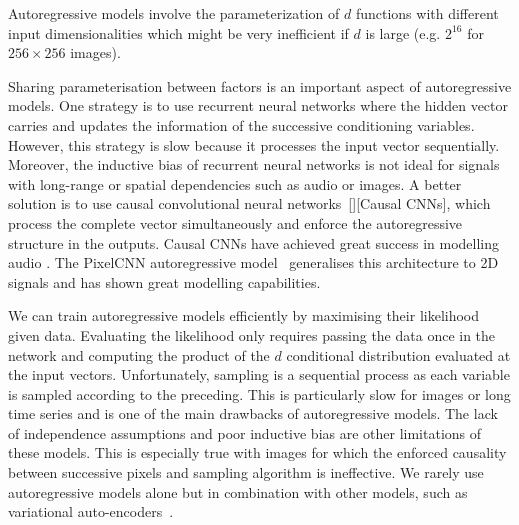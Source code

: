 Autoregressive models involve the parameterization of $d$ functions with different input dimensionalities which might be very inefficient if $d$ is large (e.g. $2^{16}$ for $256\times256$ images).

Sharing parameterisation between factors is an important aspect of autoregressive models. One strategy is to use recurrent neural networks where the hidden vector carries and updates the information of the successive conditioning variables\citep{van2016pixel}. However, this strategy is slow because it processes the input vector sequentially. Moreover, the inductive bias of recurrent neural networks is not ideal for signals with long-range or spatial dependencies such as audio or images. A better solution is to use causal convolutional neural networks~[][Causal CNNs]\citep{oord2016wavenet}, which process the complete vector simultaneously and enforce the autoregressive structure in the outputs. Causal CNNs have achieved great success in modelling audio \citep{van_den_oord_wavenet_2016, van_den_oord_parallel_2018}. The PixelCNN autoregressive model~\citep{oord_conditional_2016} generalises this architecture to 2D signals and has shown great modelling capabilities.

We can train autoregressive models efficiently by maximising their likelihood given data. Evaluating the likelihood only requires passing the data once in the network and computing the product of the $d$ conditional distribution evaluated at the input vectors. Unfortunately, sampling is a sequential process as each variable is sampled according to the preceding. This is particularly slow for images or long time series and is one of the main drawbacks of autoregressive models. The lack of independence assumptions and poor inductive bias are other limitations of these models. This is especially true with images for which the enforced causality between successive pixels and sampling algorithm is ineffective. We rarely use autoregressive models alone but in combination with other models, such as variational auto-encoders~\citep{kingma_auto-encoding_2013}.

